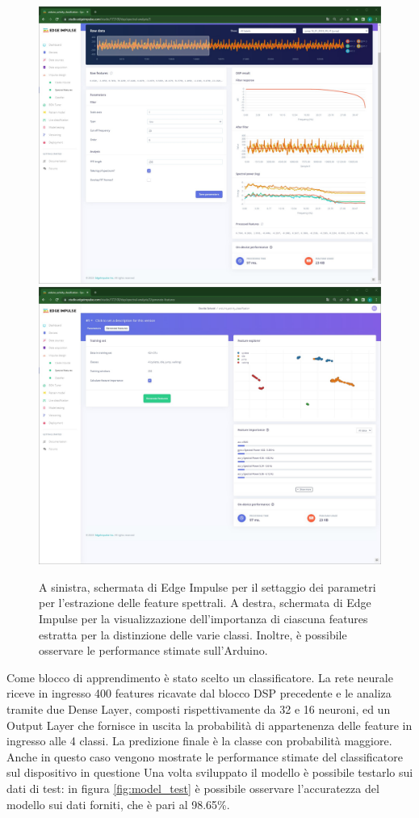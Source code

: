 \begin{figure}[t!]
	\centering
	\includegraphics[width=0.49\linewidth]{./ImageFiles/spectral_features.jpg}
	\includegraphics[width=0.49\linewidth]{./ImageFiles/features_extracted.jpg}
	\caption{A sinistra, schermata di Edge Impulse per il settaggio dei parametri per l'estrazione delle feature spettrali. A destra, schermata di Edge Impulse per la visualizzazione dell'importanza di ciascuna features estratta per la distinzione delle varie classi. Inoltre, è possibile osservare le performance stimate sull'Arduino.}
	\label{fig:spectral_feature}
\end{figure}
Come blocco di apprendimento è stato scelto un classificatore. La rete neurale riceve in ingresso 400 features ricavate dal blocco DSP precedente e le analiza tramite due Dense Layer, composti rispettivamente da 32 e 16 neuroni, ed un Output Layer che fornisce in uscita la probabilità di appartenenza delle feature in ingresso alle 4 classi. La predizione finale è la classe con probabilità maggiore. Anche in questo caso vengono mostrate le performance stimate del classificatore sul dispositivo in questione
Una volta sviluppato il modello è possibile testarlo sui dati di test: in figura \ref{fig:model_test} è possibile osservare l'accuratezza del modello sui dati forniti, che è pari al 98.65\%. 

